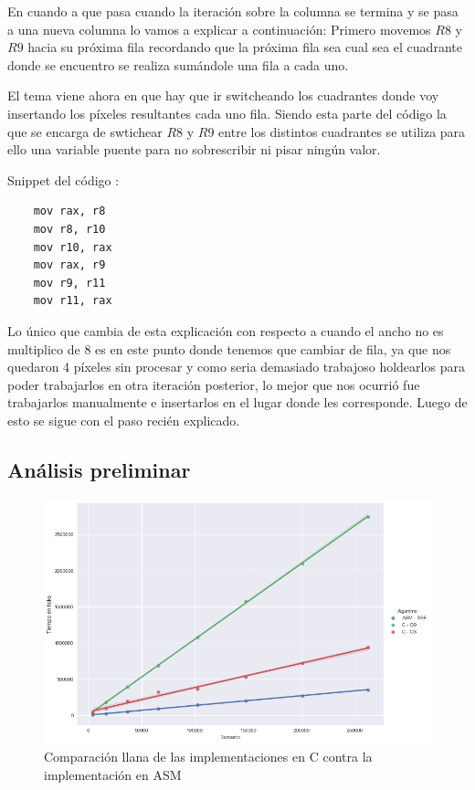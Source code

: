 En cuando a que pasa cuando la iteración sobre la columna se termina y se pasa a una nueva columna lo vamos a explicar a continuación:
Primero movemos $R8$ y $R9$ hacia su próxima fila recordando que la próxima fila sea cual sea el cuadrante donde se encuentro se realiza sumándole una fila a cada uno.

El tema viene ahora en que hay que ir switcheando los cuadrantes donde voy insertando los píxeles resultantes cada uno fila. Siendo esta parte del código la que se encarga de swtichear $R8$ y $R9$ entre los distintos cuadrantes se utiliza para ello una variable puente para no sobrescribir ni pisar ningún valor. 

Snippet del código :

\begin{lstlisting}
	mov rax, r8
	mov r8, r10
	mov r10, rax
	mov rax, r9
	mov r9, r11
	mov r11, rax
\end{lstlisting}

Lo único que cambia de esta explicación con respecto a cuando el ancho no es multiplico de 8 es en este punto donde tenemos que cambiar de fila, ya que nos quedaron 4 píxeles sin procesar y como seria demasiado trabajoso holdearlos para poder trabajarlos en otra iteración posterior, lo mejor que nos ocurrió fue trabajarlos manualmente e insertarlos en el lugar donde les corresponde. Luego de esto se sigue con el paso recién explicado.


\subsection{Análisis preliminar}

\begin{figure}[H]
	\centering
	\includegraphics[scale=0.5]{img/fourCombine_CvsASMvsO3.png}
	\caption{Comparación llana de las implementaciones en C contra la implementación en ASM}
\end{figure}

